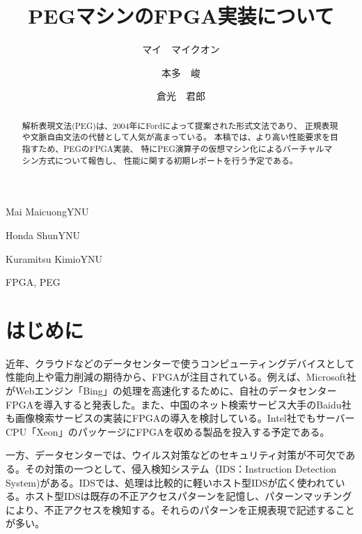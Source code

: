 \documentclass[submit]{ipsj}
\begin{document}
\title{PEGマシンのFPGA実装について}





\author{マイ　マイクオン}{Mai Maicuong}{YNU} %
\author{本多　峻}{Honda Shun}{YNU}
\author{倉光　君郎}{Kuramitsu Kimio}{YNU} %

\begin{abstract}
解析表現文法(PEG)は、2004年にFordによって提案された形式文法であり、
正規表現や文脈自由文法の代替として人気が高まっている。
本稿では、より高い性能要求を目指すため、PEGのFPGA実装、
特にPEG演算子の仮想マシン化によるバーチャルマシン方式について報告し、
性能に関する初期レポートを行う予定である。
\end{abstract}


\begin{jkeyword}
FPGA, PEG
\end{jkeyword}

\maketitle

\section{はじめに}

\cite{latex}

近年、クラウドなどのデータセンターで使うコンピューティングデバイスとして性能向上や電力削減の期待から、FPGAが注目されている。例えば、Microsoft社がWebエンジン「Bing」の処理を高速化するために、自社のデータセンターFPGAを導入すると発表した。また、中国のネット検索サービス大手のBaidu社も画像検索サービスの実装にFPGAの導入を検討している。Intel社でもサーバーCPU「Xeon」のパッケージにFPGAを収める製品を投入する予定である。

一方、データセンターでは、ウイルス対策などのセキュリティ対策が不可欠である。その対策の一つとして、侵入検知システム（IDS：Instruction Detection System)がある。IDSでは、処理は比較的に軽いホスト型IDSが広く使われている。ホスト型IDSは既存の不正アクセスパターンを記憶し、パターンマッチングにより、不正アクセスを検知する。それらのパターンを正規表現で記述することが多い。
\end{document}
